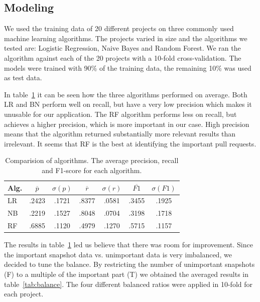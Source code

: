 \subsection{Modeling}
\label{sec:modeling}

We used the training data of 20 different projects on three commonly used machine learning algorithms.
The projects varied in size and the algorithms we tested are: Logistic Regression, Naive Bayes and Random Forest.
We ran the algorithm against each of the 20 projects with a 10-fold cross-validation.
The models were trained with 90\% of the training data, the remaining 10\% was used as test data.

In table~\ref{tab:alg-compare} it can be seen how the three algorithms performed on average.
Both LR and BN perform well on recall, but have a very low precision which makes it unusable for our application.
The RF algorithm performs less on recall, but achieves a higher precision, which is more important in our case.
High precision means that the algorithm returned substantially more relevant results than irrelevant.
It seems that RF is the best at identifying the important pull requests.

\begin{table}
  \begin{tabular}{ l | c | c | c | c | c | c }
    Alg. & $\overline{p}$ & $\sigma(p)$ & $\overline{r}$ & $\sigma(r)$ & $\overline{F1}$ & $\sigma(F1)$ \\ \hline
    \hline
    LR & .2423 & .1721 & .8377 & .0581 & .3455 & .1925 \\ \hline
    NB & .2219 & .1527 & .8048 & .0704 & .3198 & .1718 \\ \hline
    RF & .6885 & .1120 & .4979 & .1270 & .5715 & .1157 \\
  \end{tabular}
  \caption[Comparision of algorithms]{Comparision of algorithms. The average precision, recall and F1-score for each algorithm. }
  \label{tab:alg-compare}
\end{table}

The results in table~\ref{tab:alg-compare} led us believe that there was room for improvement.
Since the important snapshot data vs. unimportant data is very imbalanced, we decided to tune the balance.
By restricting the number of unimportant snapshots (F) to a multiple of the important part (T) we obtained the averaged results in table~\ref{tab:balance}.
The four different balanced ratios were applied in 10-fold for each project.

